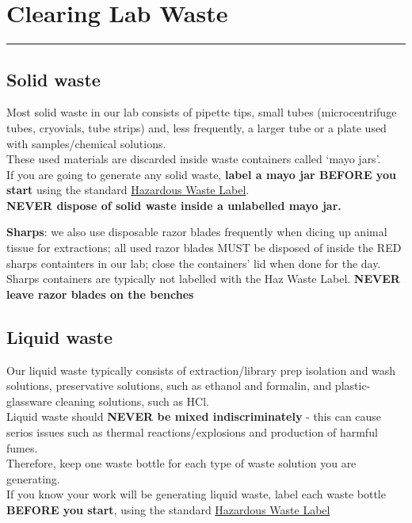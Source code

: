 \documentclass[
  letterpaper,
  DIV=11,
  numbers=noendperiod]{scrreprt}
\begin{document}
\hypertarget{clearing-lab-waste}{%
\chapter{Clearing Lab Waste}\label{clearing-lab-waste}}

\begin{center}\rule{0.5\linewidth}{0.5pt}\end{center}

\hypertarget{solid-waste}{%
\section*{\texorpdfstring{\textbf{Solid
waste}}{Solid waste}}\label{solid-waste}}


Most solid waste in our lab consists of pipette tips, small tubes
(microcentrifuge tubes, cryovials, tube strips) and, less frequently, a
larger tube or a plate used with samples/chemical solutions.\\
These used materials are discarded inside waste containers called `mayo
jars'.\\
If you are going to generate any solid waste, \textbf{label a mayo jar
BEFORE you start} using the standard
\href{https://github.com/DrK-Lo/lotterhoslabprotocols/blob/gh-pages/notebook/Haz\%20Waste\%20labels.pdf}{Hazardous
Waste Label}.\\
\textbf{NEVER dispose of solid waste inside a unlabelled mayo jar.}

\textbf{Sharps}: we also use disposable razor blades frequently when
dicing up animal tissue for extractions; all used razor blades MUST be
disposed of inside the RED sharps containters in our lab; close the
containers' lid when done for the day. Sharps containers are typically
not labelled with the Haz Waste Label. \textbf{NEVER leave razor blades
on the benches}

\hypertarget{liquid-waste}{%
\section*{\texorpdfstring{\textbf{Liquid
waste}}{Liquid waste}}\label{liquid-waste}}


Our liquid waste typically consists of extraction/library prep isolation
and wash solutions, preservative solutions, such as ethanol and
formalin, and plastic-glassware cleaning solutions, such as HCl.\\
Liquid waste should \textbf{NEVER be mixed indiscriminately} - this can
cause serios issues such as thermal reactions/explosions and production
of harmful fumes.\\
Therefore, keep one waste bottle for each type of waste solution you are
generating.\\
If you know your work will be generating liquid waste, label each waste
bottle \textbf{BEFORE you start}, using the standard
\href{https://github.com/DrK-Lo/lotterhoslabprotocols/blob/gh-pages/notebook/Haz\%20Waste\%20labels.pdf}{Hazardous
Waste Label}
\end{document}
